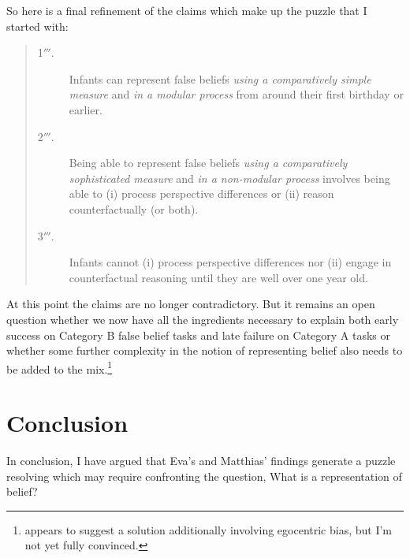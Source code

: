 \documentclass[12pt,\papersize]{extarticle}
\begin{document}
So here is a final refinement of the claims which make up the puzzle that I started with:
%
\begin{quote}
\begin{description}
\item[1$'''$.] Infants can represent false beliefs \emph{using a comparatively simple measure} and \emph{in a modular process} from around their first birthday or earlier.
%
\item[2$'''$.] Being able to represent false beliefs \emph{using a comparatively sophisticated measure} and  \emph{in a non-modular process}  involves being able to  (i) process perspective differences or (ii) reason counterfactually (or both). 
%
\item[3$'''$.] Infants cannot (i) process perspective differences nor (ii) engage in counterfactual reasoning until they are well over one year old.  
\end{description}
\end{quote}
%
At this point the claims are no longer contradictory.
But it remains an open question whether we now have all the ingredients necessary to explain both early success on Category B false belief tasks and late failure on Category A tasks or whether  some further complexity in the notion of representing belief also needs to be added to the mix.\footnote{
\citet[p.\ 155-6]{Apperly:2010kx} appears to suggest a solution additionally involving egocentric bias, but I'm not yet fully convinced.
}



\section{Conclusion}
In conclusion,
I have argued that  Eva's and Matthias' findings generate a puzzle  resolving which may require confronting the question, What is a representation of belief?














\end{document}
